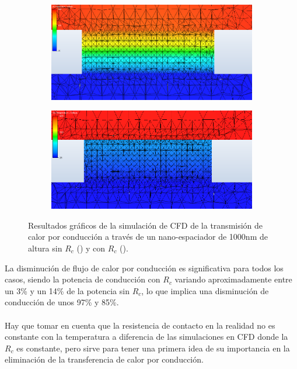 \graphicspath{ {./figuras/Resultados/conduccion/} }
\begin{figure}[H]
	\centering 		%
	\begin{subfigure}[b]{0.49\textwidth}
	\centering
		\includegraphics[width=1.00\textwidth]{SiSiO2Si_1000nm_Plane2.png}
		\caption{ }
	\label{fig:Pcond_SiSiO2Si_CFD}
\end{subfigure}
\hfill 					%
\begin{subfigure}[b]{0.49\textwidth}
	\centering
		\includegraphics[width=1.00\textwidth]{SiSiO2Si_1000nm_Plane_Rc.png}
		\caption{ }
	\label{fig:Pcond_SiSiO2Si_Rc_CFD}
\end{subfigure}
\caption{Resultados gráficos de la simulación de CFD de la transmisión de calor por conducción a través de un nano-espaciador de 1000nm de altura sin $R_c$ () y con $R_c$ ().}
	\label{fig:Pconds_SiSiO2Si_CFD}
\end{figure}
La disminución de flujo de calor por conducción es significativa para todos los casos, siendo la potencia de conducción con $R_c$ variando aproximadamente entre un 3\% y un 14\% de la potencia sin $R_c$, lo que implica una disminución de conducción de unos 97\% y 85\%.\\\\
Hay que tomar en cuenta que la resistencia de contacto en la realidad no es constante con la temperatura a diferencia de las simulaciones en CFD donde la $R_c$ es constante, pero sirve para tener una primera idea de su importancia en la eliminación de la transferencia de calor por conducción.
